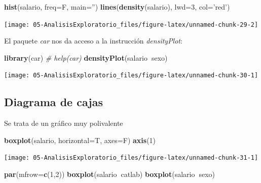 \documentclass[]{book}
\newenvironment{Shaded}{\begin{snugshade}}{\end{snugshade}}
\newcommand{\KeywordTok}[1]{\textcolor[rgb]{0.13,0.29,0.53}{\textbf{#1}}}
\newcommand{\DataTypeTok}[1]{\textcolor[rgb]{0.13,0.29,0.53}{#1}}
\newcommand{\DecValTok}[1]{\textcolor[rgb]{0.00,0.00,0.81}{#1}}
\newcommand{\StringTok}[1]{\textcolor[rgb]{0.31,0.60,0.02}{#1}}
\newcommand{\CommentTok}[1]{\textcolor[rgb]{0.56,0.35,0.01}{\textit{#1}}}
\newcommand{\OperatorTok}[1]{\textcolor[rgb]{0.81,0.36,0.00}{\textbf{#1}}}
\newcommand{\NormalTok}[1]{#1}
\begin{document}
\begin{Shaded}
\begin{Highlighting}[]
\KeywordTok{hist}\NormalTok{(salario, }\DataTypeTok{freq=}\NormalTok{F, }\DataTypeTok{main=}\StringTok{''}\NormalTok{)}
\KeywordTok{lines}\NormalTok{(}\KeywordTok{density}\NormalTok{(salario), }\DataTypeTok{lwd=}\DecValTok{3}\NormalTok{, }\DataTypeTok{col=}\StringTok{'red'}\NormalTok{)}
\end{Highlighting}
\end{Shaded}

\begin{center}\texttt{[image: 05-AnalisisExploratorio\_files/figure-latex/unnamed-chunk-29-2]} \end{center}

El paquete \emph{car} nos da acceso a la instrucción \emph{densityPlot}:

\begin{Shaded}
\begin{Highlighting}[]
\KeywordTok{library}\NormalTok{(car)  }\CommentTok{# help(car)}
\KeywordTok{densityPlot}\NormalTok{(salario}\OperatorTok{~}\NormalTok{sexo)}
\end{Highlighting}
\end{Shaded}

\begin{center}\texttt{[image: 05-AnalisisExploratorio\_files/figure-latex/unnamed-chunk-30-1]} \end{center}

\subsection{Diagrama de cajas}\label{diagrama-de-cajas}

Se trata de un gráfico muy polivalente

\begin{Shaded}
\begin{Highlighting}[]
\KeywordTok{boxplot}\NormalTok{(salario, }\DataTypeTok{horizontal=}\NormalTok{T, }\DataTypeTok{axes=}\NormalTok{F)}
\KeywordTok{axis}\NormalTok{(}\DecValTok{1}\NormalTok{)}
\end{Highlighting}
\end{Shaded}

\begin{center}\texttt{[image: 05-AnalisisExploratorio\_files/figure-latex/unnamed-chunk-31-1]} \end{center}

\begin{Shaded}
\begin{Highlighting}[]
\KeywordTok{par}\NormalTok{(}\DataTypeTok{mfrow=}\KeywordTok{c}\NormalTok{(}\DecValTok{1}\NormalTok{,}\DecValTok{2}\NormalTok{))}
\KeywordTok{boxplot}\NormalTok{(salario}\OperatorTok{~}\NormalTok{catlab)}
\KeywordTok{boxplot}\NormalTok{(salario}\OperatorTok{~}\NormalTok{sexo)}
\end{Highlighting}
\end{Shaded}
\end{document}
